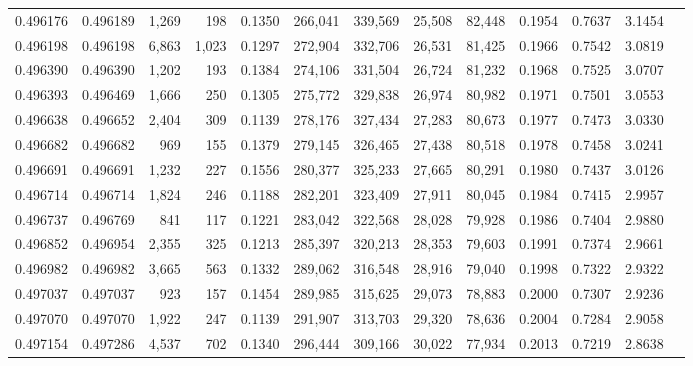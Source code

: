\begin{tabular}{rrrrrrrrrrrrr}
0.496176 & 0.496189 & 1,269 &   198 &                                     0.1350 & 266,041 & 339,569 &  25,508 &  82,448 & 0.1954 & 0.7637 & 3.1454 \\
0.496198 & 0.496198 & 6,863 & 1,023 &                                     0.1297 & 272,904 & 332,706 &  26,531 &  81,425 & 0.1966 & 0.7542 & 3.0819 \\
0.496390 & 0.496390 & 1,202 &   193 &                                     0.1384 & 274,106 & 331,504 &  26,724 &  81,232 & 0.1968 & 0.7525 & 3.0707 \\
0.496393 & 0.496469 & 1,666 &   250 &                                     0.1305 & 275,772 & 329,838 &  26,974 &  80,982 & 0.1971 & 0.7501 & 3.0553 \\
0.496638 & 0.496652 & 2,404 &   309 &                                     0.1139 & 278,176 & 327,434 &  27,283 &  80,673 & 0.1977 & 0.7473 & 3.0330 \\
0.496682 & 0.496682 &   969 &   155 &                                     0.1379 & 279,145 & 326,465 &  27,438 &  80,518 & 0.1978 & 0.7458 & 3.0241 \\
0.496691 & 0.496691 & 1,232 &   227 &                                     0.1556 & 280,377 & 325,233 &  27,665 &  80,291 & 0.1980 & 0.7437 & 3.0126 \\
0.496714 & 0.496714 & 1,824 &   246 &                                     0.1188 & 282,201 & 323,409 &  27,911 &  80,045 & 0.1984 & 0.7415 & 2.9957 \\
0.496737 & 0.496769 &   841 &   117 &                                     0.1221 & 283,042 & 322,568 &  28,028 &  79,928 & 0.1986 & 0.7404 & 2.9880 \\
0.496852 & 0.496954 & 2,355 &   325 &                                     0.1213 & 285,397 & 320,213 &  28,353 &  79,603 & 0.1991 & 0.7374 & 2.9661 \\
0.496982 & 0.496982 & 3,665 &   563 &                                     0.1332 & 289,062 & 316,548 &  28,916 &  79,040 & 0.1998 & 0.7322 & 2.9322 \\
0.497037 & 0.497037 &   923 &   157 &                                     0.1454 & 289,985 & 315,625 &  29,073 &  78,883 & 0.2000 & 0.7307 & 2.9236 \\
0.497070 & 0.497070 & 1,922 &   247 &                                     0.1139 & 291,907 & 313,703 &  29,320 &  78,636 & 0.2004 & 0.7284 & 2.9058 \\
0.497154 & 0.497286 & 4,537 &   702 &                                     0.1340 & 296,444 & 309,166 &  30,022 &  77,934 & 0.2013 & 0.7219 & 2.8638 \\

\end{tabular}
